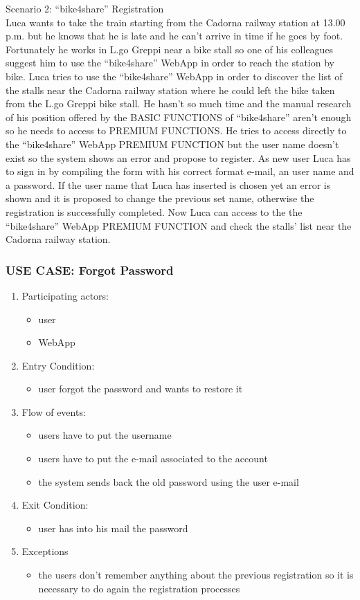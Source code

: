 \documentclass{article}
\begin{document}
Scenario 2: “bike4share” Registration \\
Luca wants to take the train starting from the Cadorna railway station at 13.00 p.m. but he knows that he is late and he can’t arrive in time if he goes by foot. Fortunately he works in L.go Greppi near a bike stall so one of his colleagues suggest him to use the “bike4share” WebApp in order to reach the station by bike. Luca tries to use the “bike4share” WebApp in order to discover the list of the stalls near the Cadorna railway station where he could left the bike taken from the L.go Greppi bike stall. 
He hasn’t so much time and the manual research of his position offered by the BASIC FUNCTIONS of “bike4share” aren’t enough so he needs to access to PREMIUM FUNCTIONS.
He tries to access directly to the “bike4share” WebApp PREMIUM FUNCTION but the user name doesn’t exist so the system shows an error and propose to register.
As new user Luca has to sign in by compiling the form with his correct format e-mail, an user name and a password. 
If the user name that Luca has inserted is chosen yet an error is shown and it is proposed to change the previous set name, otherwise the registration is successfully completed.
Now Luca can access to the the “bike4share” WebApp PREMIUM FUNCTION and check the stalls’ list near the Cadorna railway station.

\subsubsection{\textbf{USE CASE}: Forgot Password}
\begin{enumerate}
\item Participating actors: 
\begin{itemize}
    \item user
    \item WebApp
\end{itemize}
\item Entry Condition: 
\begin{itemize}
    \item user forgot the password and wants to restore it
\end{itemize}
\item Flow of events: 
\begin{itemize}
    \item users have to put the username 
    \item users have to put the e-mail associated to the account 
    \item the system sends back the old password using the user e-mail
\end{itemize}
\item Exit Condition: 
\begin{itemize}
    \item user has into his mail the password
\end{itemize}
\item Exceptions
\begin{itemize}
    \item the users don’t remember anything about the previous registration so it is necessary to do again the registration processes
\end{itemize}
\end{enumerate}
\end{document}
